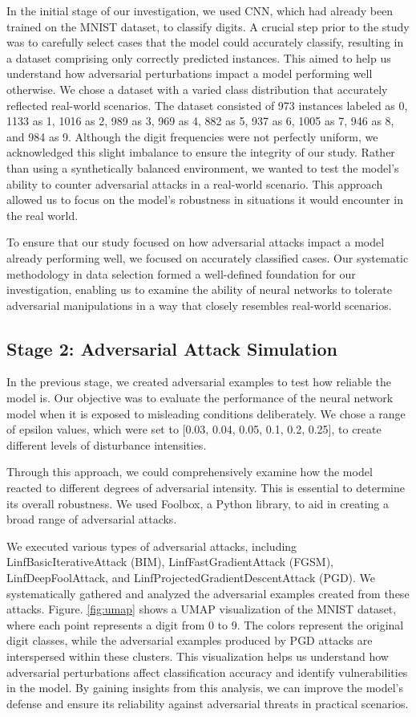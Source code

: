 \documentclass[10pt, conference, a4paper, final]{IEEEtran}
\begin{document}
In the initial stage of our investigation, we used CNN, which had already been trained on the MNIST dataset, to classify digits. A crucial step prior to the study was to carefully select cases that the model could accurately classify, resulting in a dataset comprising only correctly predicted instances. This aimed to help us understand how adversarial perturbations impact a model performing well otherwise.
We chose a dataset with a varied class distribution that accurately reflected real-world scenarios. The dataset consisted of 973 instances labeled as 0, 1133 as 1, 1016 as 2, 989 as 3, 969 as 4, 882 as 5, 937 as 6, 1005 as 7, 946 as 8, and 984 as 9. Although the digit frequencies were not perfectly uniform, we acknowledged this slight imbalance to ensure the integrity of our study. Rather than using a synthetically balanced environment, we wanted to test the model's ability to counter adversarial attacks in a real-world scenario. This approach allowed us to focus on the model's robustness in situations it would encounter in the real world.

To ensure that our study focused on how adversarial attacks impact a model already performing well, we focused on accurately classified cases. Our systematic methodology in data selection formed a well-defined foundation for our investigation, enabling us to examine the ability of neural networks to tolerate adversarial manipulations in a way that closely resembles real-world scenarios.


\subsection{Stage 2: Adversarial Attack Simulation}

In the previous stage, we created adversarial examples to test how reliable the model is. Our objective was to evaluate the performance of the neural network model when it is exposed to misleading conditions deliberately. We chose a range of epsilon values, which were set to [0.03, 0.04, 0.05, 0.1, 0.2, 0.25], to create different levels of disturbance intensities.

Through this approach, we could comprehensively examine how the model reacted to different degrees of adversarial intensity. This is essential to determine its overall robustness. We used Foolbox, a Python library, to aid in creating a broad range of adversarial attacks.

We executed various types of adversarial attacks, including LinfBasicIterativeAttack (BIM), LinfFastGradientAttack (FGSM), LinfDeepFoolAttack, and LinfProjectedGradientDescentAttack (PGD). We systematically gathered and analyzed the adversarial examples created from these attacks.
Figure. \ref{fig:umap} shows a UMAP visualization of the MNIST dataset, where each point represents a digit from 0 to 9. The colors represent the original digit classes, while the adversarial examples produced by PGD attacks are interspersed within these clusters. This visualization helps us understand how adversarial perturbations affect classification accuracy and identify vulnerabilities in the model. By gaining insights from this analysis, we can improve the model's defense and ensure its reliability against adversarial threats in practical scenarios.
\end{document}
